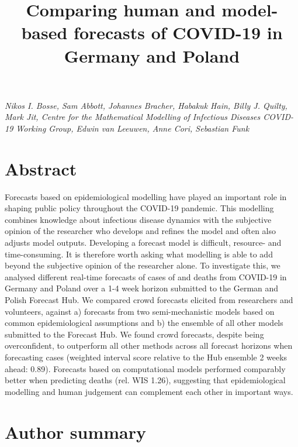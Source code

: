 \documentclass[
]{article}
\title{Comparing human and model-based forecasts of COVID-19 in Germany and Poland}
\author{}
\date{\vspace{-2.5em}}
\begin{document}
\maketitle

\emph{Nikos I. Bosse, Sam Abbott, Johannes Bracher, Habakuk Hain, Billy J. Quilty, Mark Jit, Centre for the Mathematical Modelling of Infectious Diseases COVID-19 Working Group, Edwin van Leeuwen, Anne Cori, Sebastian Funk}

\hypertarget{abstract}{%
\section{Abstract}\label{abstract}}

Forecasts based on epidemiological modelling have played an important role in shaping public policy throughout the COVID-19 pandemic. This modelling combines knowledge about infectious disease dynamics with the subjective opinion of the researcher who develops and refines the model and often also adjusts model outputs. Developing a forecast model is difficult, resource- and time-consuming. It is therefore worth asking what modelling is able to add beyond the subjective opinion of the researcher alone. To investigate this, we analysed different real-time forecasts of cases of and deaths from COVID-19 in Germany and Poland over a 1-4 week horizon submitted to the German and Polish Forecast Hub. We compared crowd forecasts elicited from researchers and volunteers, against a) forecasts from two semi-mechanistic models based on common epidemiological assumptions and b) the ensemble of all other models submitted to the Forecast Hub. We found crowd forecasts, despite being overconfident, to outperform all other methods across all forecast horizons when forecasting cases (weighted interval score relative to the Hub ensemble 2 weeks ahead: 0.89). Forecasts based on computational models performed comparably better when predicting deaths (rel. WIS 1.26), suggesting that epidemiological modelling and human judgement can complement each other in important ways.

\hypertarget{author-summary}{%
\section{Author summary}\label{author-summary}}
\end{document}
